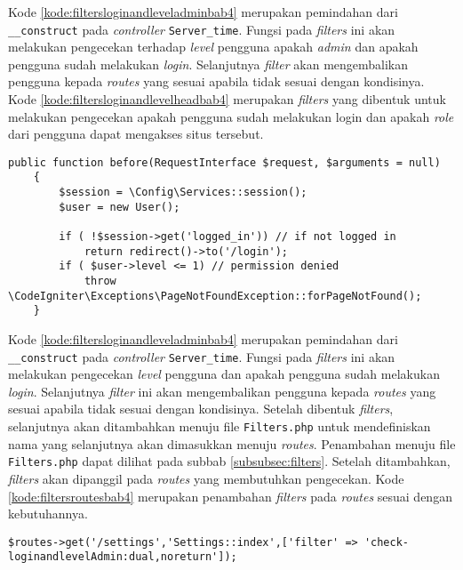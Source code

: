 Kode \ref{kode:filtersloginandleveladminbab4} merupakan pemindahan dari \texttt{\_\_construct} pada \textit{controller}  \texttt{Server\_time}. Fungsi pada \textit{filters} ini akan melakukan pengecekan terhadap \textit{level} pengguna apakah \textit{admin} dan apakah pengguna sudah melakukan \textit{login}. Selanjutnya \textit{filter} akan mengembalikan pengguna kepada \textit{routes} yang sesuai apabila tidak sesuai dengan kondisinya. Kode \ref{kode:filtersloginandlevelheadbab4} merupakan \textit{filters} yang dibentuk untuk melakukan pengecekan apakah pengguna sudah melakukan login dan apakah \textit{role} dari pengguna dapat mengakses situs tersebut.

\begin{lstlisting}[caption=Pemindahan kode pada \textit{Filters} \texttt{CheckLoginandLevelHead.php}, label=kode:filtersloginandlevelheadbab4]
	public function before(RequestInterface $request, $arguments = null)
    {   
        $session = \Config\Services::session();
        $user = new User();

		if ( !$session->get('logged_in')) // if not logged in
			return redirect()->to('/login');
        if ( $user->level <= 1) // permission denied
			throw \CodeIgniter\Exceptions\PageNotFoundException::forPageNotFound();	
    }
\end{lstlisting}

Kode \ref{kode:filtersloginandleveladminbab4} merupakan pemindahan dari \texttt{\_\_construct} pada \textit{controller} \texttt{Server\_time}. Fungsi pada \textit{filters} ini akan melakukan pengecekan \textit{level} pengguna dan apakah pengguna sudah melakukan \textit{login}. Selanjutnya \textit{filter} ini akan mengembalikan pengguna kepada \textit{routes} yang sesuai apabila tidak sesuai dengan kondisinya. Setelah dibentuk \textit{filters}, selanjutnya akan ditambahkan menuju file \texttt{Filters.php} untuk mendefiniskan nama yang selanjutnya akan dimasukkan menuju \textit{routes}. Penambahan menuju file \texttt{Filters.php} dapat dilihat pada subbab \ref{subsubsec:filters}. Setelah ditambahkan, \textit{filters} akan dipanggil pada \textit{routes} yang membutuhkan pengecekan. Kode \ref{kode:filtersroutesbab4} merupakan penambahan \textit{filters} pada \textit{routes} sesuai dengan kebutuhannya.

\begin{lstlisting}[caption=Penambahan \textit{filter} pada \textit{routes}, label=kode:filtersroutesbab4]
	$routes->get('/settings','Settings::index',['filter' => 'check-loginandlevelAdmin:dual,noreturn']);
\end{lstlisting}

